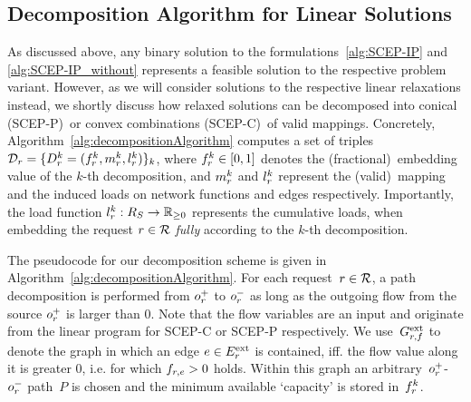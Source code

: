 \documentclass[10pt, conference, letterpaper]{IEEEtran}
\begin{document}
\subsection{Decomposition Algorithm for Linear Solutions}
\label{sec:decomp-algorithm-synopsis}


As discussed above, any binary solution to the formulations~\ref{alg:SCEP-IP} and \ref{alg:SCEP-IP_without} represents a feasible solution to the respective problem variant. However, as we will consider solutions to the respective linear relaxations instead, we shortly discuss how relaxed solutions can be decomposed into conical (SCEP-P)~or convex combinations (SCEP-C)~of valid mappings. Concretely, Algorithm~\ref{alg:decompositionAlgorithm} computes a set of triples $\PotEmbeddings = \{\decomp = (\prob,\mapping,\load)\}_k$, where $\prob \in [0,1]$ denotes the (fractional)~embedding value of the $k$-th decomposition, and $\mapping$ and $\load$ represent the (valid)~mapping and the induced loads on network functions and edges respectively. Importantly, the load function $\load : \SR \to \preals$ represents the cumulative loads, when embedding the request $r \in \mathcal{R} $ \emph{fully} according to the $k$-th decomposition.

The pseudocode for our decomposition scheme 
is given in Algorithm~\ref{alg:decompositionAlgorithm}. 
For each request~$r \in \mathcal{R}$, a path 
decomposition is performed from $o^+_{r}$ to $o^-_{r}$ as long as the outgoing flow from the source $o^+_{r}$ is larger than 0. Note that the flow variables are an input and originate from the  linear program for SCEP-C or SCEP-P respectively.
We use~$G^{\textnormal{ext}}_{r,f}$ to denote the graph in which an edge $e \in E^{\textnormal{ext}}_{r}$ is contained, iff. the flow value along it is greater 0, i.e. for which 
$f_{r,e} > 0$ holds. Within this graph 
an arbitrary~$o^+_{r}$-$o^-_{r}$ path~$P$ is chosen and the minimum available 
`capacity' is stored in~$f^k_{r}$.
\end{document}
